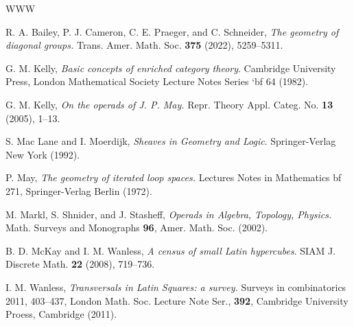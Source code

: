\documentclass{amsart} %
\theoremstyle{plain}\newtheorem{Theorem}{Theorem}[section]
\theoremstyle{plain}\newtheorem{Conjecture}[Theorem]{Conjecture}
\theoremstyle{plain}\newtheorem{Corollary}[Theorem]{Corollary}
\theoremstyle{plain}\newtheorem{Lemma}[Theorem]{Lemma}
\theoremstyle{plain}\newtheorem{Proposition}[Theorem]{Proposition}
\theoremstyle{definition}\newtheorem{Definition}[Theorem]{Definition}
\theoremstyle{definition}\newtheorem{Example}[Theorem]{Example}
\theoremstyle{definition}\newtheorem{Examples}[Theorem]{Examples}
\theoremstyle{definition}\newtheorem{Remark}[Theorem]{Remark}
\theoremstyle{definition}\newtheorem{Remarks}[Theorem]{Remarks}
\theoremstyle{plain}\newtheorem{Statement}[Theorem]{}
\begin{document}
\begin{thebibliography}{WWW}

 R. A. Bailey, P. J. Cameron, C. E. Praeger, and C. Schneider,
{\em The geometry of diagonal groups.} Trans. Amer. Math. Soc. {\bf 375}
(2022),  5259--5311.


 G. M. Kelly, {\em Basic concepts of enriched category theory}.
Cambridge University Press, London Mathematical Society Lecture
Notes Series {`bf 64} (1982).

 G. M. Kelly, {\em  On the operads of J. P. May.} 
Repr. Theory Appl. Categ. No. {\bf 13}  (2005), 1--13.


 S. Mac Lane and I. Moerdijk, {\em Sheaves in Geometry and Logic}. 
Springer-Verlag New York (1992).

 P. May, {\em The geometry of iterated loop spaces.} %
Lectures Notes in Mathematics {bf 271}, Springer-Verlag Berlin  (1972).

 M. Markl, S. Shnider, and J. Stasheff, %
{\em Operads in Algebra, Topology, Physics.} Math. Surveys and Monographs {\bf 96},
Amer. Math. Soc. (2002). 

 B. D. McKay and I. M. Wanless, {\em A census of small Latin
hypercubes}. SIAM J. Discrete Math. {\bf 22} (2008), 719--736.

 I. M. Wanless, {\em Transversals in Latin Squares: a survey.} Surveys in
combinatorics 2011, 403--437, London Math. Soc. Lecture Note Ser., {\bf 392}, 
Cambridge University Proess, Cambridge (2011).


\end{thebibliography}
\end{document}
